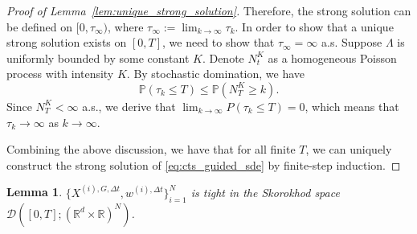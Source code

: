 \documentclass{article}
\theoremstyle{plain}
\newtheorem{lemma}[theorem]{Lemma}
\theoremstyle{definition}
\theoremstyle{remark}
\renewcommand{\P}{{\mathbb{P}}}
\newcommand{\R}{{\mathbb{R}}}
\begin{document}
\begin{proof}[Proof of Lemma~\ref{lem:unique_strong_solution}]
    Therefore, the strong solution can be defined on \([0,\tau_{\infty})\), where \(\tau_{\infty}:=\lim_{k\rightarrow \infty}\tau_k\). In order to show that a unique strong solution exists on \([0,T]\), we need to show that \(\tau_{\infty}=\infty\) a.s. Suppose \(\Lambda\) is uniformly bounded by some constant \(K\). Denote \(N_{t}^K\) as a homogeneous Poisson process with intensity \(K\). By stochastic domination, we have \[
        \P(\tau_k\leq T)\leq \P(N_T^K\geq k).
    \] 
    Since \(N_T^K<\infty\) a.s., we derive that \(\lim_{k \to \infty} P(\tau_k \le T) = 0\), which means that \(\tau_k\rightarrow\infty\) as \(k\rightarrow \infty\). 
    
    Combining the above discussion, we have that for all finite \(T\), we can uniquely construct the strong solution of \eqref{eq:cts_guided_sde} by finite-step induction.
\end{proof}



\begin{lemma}
\(\{X^{(i),G,\Delta t},w^{(i),\Delta t}\}_{i=1}^N\) is tight in the Skorokhod space \(\mathcal{D}([0,T];(\R^d \times \R)^{N})\).
\label{lem:relatively_tight}
\end{lemma}
\end{document}
